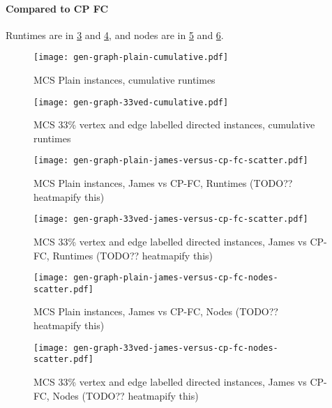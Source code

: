 \documentclass[letterpaper]{article}
\begin{document}
\paragraph{Compared to CP FC} Runtimes are in \cref{figure:plain-james-versus-cp-fc-scatter} and \cref{figure:33ved-james-versus-cp-fc-scatter}, and nodes are in \cref{figure:plain-james-versus-cp-fc-nodes-scatter} and \cref{figure:33ved-james-versus-cp-fc-nodes-scatter}.

\begin{figure}
    \centering
    \texttt{[image: gen-graph-plain-cumulative.pdf]}
    \caption{MCS Plain instances, cumulative runtimes}\label{figure:plain-cumulative}
\end{figure}

\begin{figure}
    \centering
    \texttt{[image: gen-graph-33ved-cumulative.pdf]}
    \caption{MCS 33\% vertex and edge labelled directed instances, cumulative runtimes}\label{figure:33ved-cumulative}
\end{figure}

\begin{figure}
    \centering
    \texttt{[image: gen-graph-plain-james-versus-cp-fc-scatter.pdf]}
    \caption{MCS Plain instances, James vs CP-FC, Runtimes (TODO?? heatmapify this)}\label{figure:plain-james-versus-cp-fc-scatter}
\end{figure}

\begin{figure}
    \centering
    \texttt{[image: gen-graph-33ved-james-versus-cp-fc-scatter.pdf]}
    \caption{MCS 33\% vertex and edge labelled directed instances, James vs CP-FC, Runtimes (TODO?? heatmapify this)}\label{figure:33ved-james-versus-cp-fc-scatter}
\end{figure}

\begin{figure}
    \centering
    \texttt{[image: gen-graph-plain-james-versus-cp-fc-nodes-scatter.pdf]}
    \caption{MCS Plain instances, James vs CP-FC, Nodes (TODO?? heatmapify this)}\label{figure:plain-james-versus-cp-fc-nodes-scatter}
\end{figure}

\begin{figure}
    \centering
    \texttt{[image: gen-graph-33ved-james-versus-cp-fc-nodes-scatter.pdf]}
    \caption{MCS 33\% vertex and edge labelled directed instances, James vs CP-FC, Nodes (TODO?? heatmapify this)}\label{figure:33ved-james-versus-cp-fc-nodes-scatter}
\end{figure}



\end{document}
